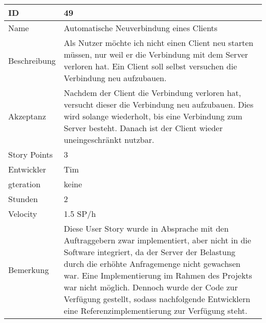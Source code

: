 \begin{table}[htbp]
    \begin{minipage}{\linewidth}
        \setlength{\tymax}{0.5\linewidth}
        \centering
        \small
        \begin{tabulary}{\textwidth}{|l|p{10cm}|} \hline
            ID   &49\\\hline
            Name  &Automatische Neuverbindung eines Clients\\\hline
            Beschreibung&Als Nutzer möchte ich nicht einen Client neu starten müssen, nur weil er die Verbindung mit dem Server verloren hat. Ein Client soll selbst versuchen die Verbindung neu aufzubauen.\\\hline
            Akzeptanz &Nachdem der Client die Verbindung verloren hat, versucht dieser die Verbindung neu aufzubauen. Dies wird solange wiederholt, bis eine Verbindung zum Server besteht. Danach ist der Client wieder uneingeschränkt nutzbar.\\\hline
            Story Points&3\\\hline
            Entwickler &Tim\\\hline
            gteration &keine\\\hline
            Stunden  &2\\\hline
            Velocity &1.5 SP\slash h\\\hline
            Bemerkung & Diese User Story wurde in Absprache mit den Auftraggebern zwar implementiert, aber nicht in die Software integriert, da der Server der Belastung durch die erhöhte Anfragemenge nicht gewachsen war. Eine Implementierung im Rahmen des Projekts war nicht möglich. Dennoch wurde der Code zur Verfügung gestellt, sodass nachfolgende Entwicklern eine Referenzimplementierung zur Verfügung steht.\\\hline
        \end{tabulary}
    \end{minipage}
\end{table}

